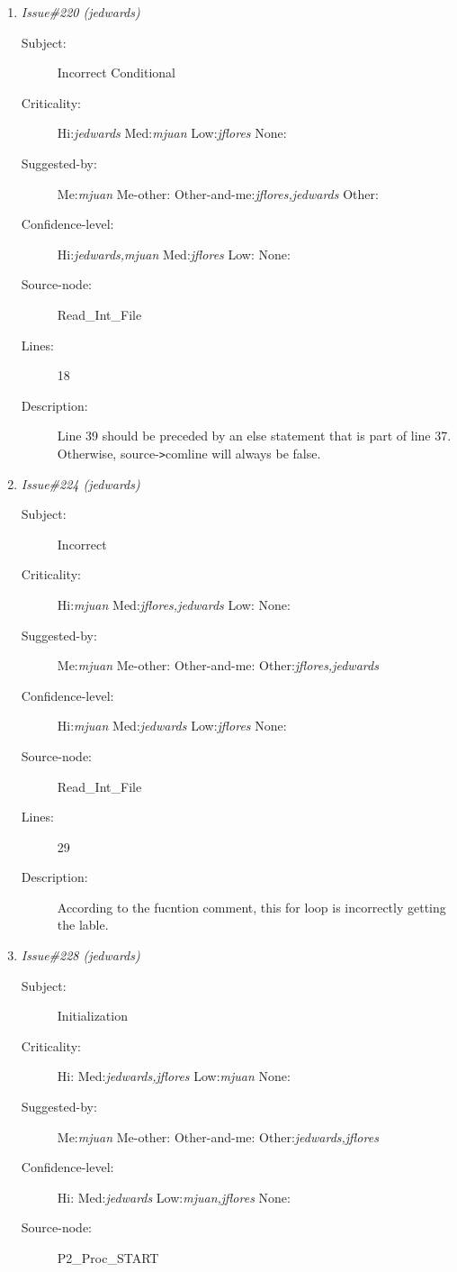 \begin{enumerate}
\begin{description}
\item [Lines:] 31

\item [Description:] The loop traverses for 5 iterations whereas
the operation length requires 6.
\end{description}
\item {\it Issue\#220 (jedwards)}
\begin{description}
\item [Subject:] Incorrect Conditional
\item [Criticality:] Hi:{\it jedwards} Med:{\it mjuan} Low:{\it jflores} None:{\it }
\item [Suggested-by:] Me:{\it mjuan} Me-other:{\it } Other-and-me:{\it jflores,jedwards} Other:{\it }
\item [Confidence-level:] Hi:{\it jedwards,mjuan} Med:{\it jflores} Low:{\it } None:{\it }
\item [Source-node:] Read\_Int\_File

\item [Lines:] 18

\item [Description:] Line 39 should be preceded by an else
statement that is part of line 37.  Otherwise, source-{\tt >}comline will always be
false.
\end{description}
\item {\it Issue\#224 (jedwards)}
\begin{description}
\item [Subject:] Incorrect
\item [Criticality:] Hi:{\it mjuan} Med:{\it jflores,jedwards} Low:{\it } None:{\it }
\item [Suggested-by:] Me:{\it mjuan} Me-other:{\it } Other-and-me:{\it } Other:{\it jflores,jedwards}
\item [Confidence-level:] Hi:{\it mjuan} Med:{\it jedwards} Low:{\it jflores} None:{\it }
\item [Source-node:] Read\_Int\_File

\item [Lines:] 29

\item [Description:] According to the fucntion comment, this for
loop is incorrectly getting the lable.
\end{description}
\item {\it Issue\#228 (jedwards)}
\begin{description}
\item [Subject:] Initialization
\item [Criticality:] Hi:{\it } Med:{\it jedwards,jflores} Low:{\it mjuan} None:{\it }
\item [Suggested-by:] Me:{\it mjuan} Me-other:{\it } Other-and-me:{\it } Other:{\it jedwards,jflores}
\item [Confidence-level:] Hi:{\it } Med:{\it jedwards} Low:{\it mjuan,jflores} None:{\it }
\item [Source-node:] P2\_Proc\_START


\end{description}
\end{enumerate}
